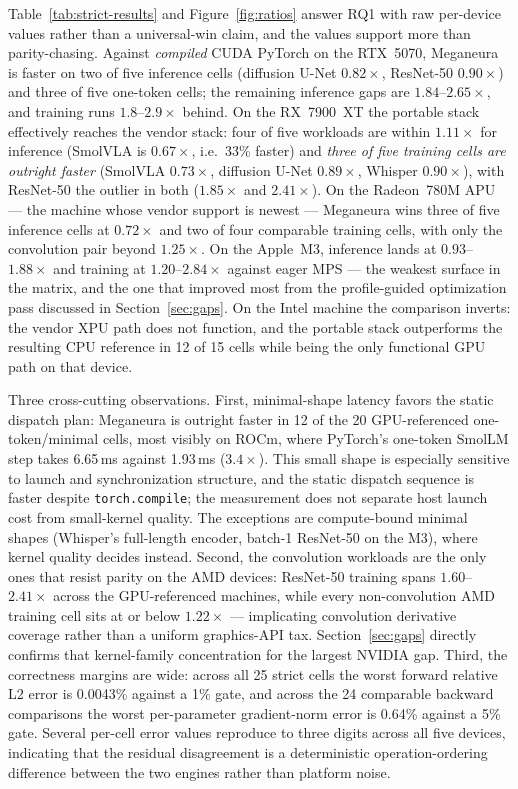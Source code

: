 \documentclass[10pt,twocolumn]{article}
\newcommand{\system}{Meganeura}
\newcommand{\code}[1]{\texttt{#1}}
\begin{document}
Table~\ref{tab:strict-results} and Figure~\ref{fig:ratios} answer RQ1 with
raw per-device values rather than a universal-win claim, and the values
support more than parity-chasing.
Against \emph{compiled} CUDA PyTorch on the RTX~5070, \system{} is faster on
two of five inference cells (diffusion U-Net $0.82\times$, ResNet-50
$0.90\times$) and three of five one-token cells; the remaining inference
gaps are $1.84$--$2.65\times$, and training runs $1.8$--$2.9\times$ behind.
On the RX~7900~XT the portable stack effectively reaches the vendor stack:
four of five workloads are within $1.11\times$ for inference (SmolVLA is
$0.67\times$, i.e.\ 33\% faster) and \emph{three of five training cells are
outright faster} (SmolVLA $0.73\times$, diffusion U-Net $0.89\times$,
Whisper $0.90\times$), with ResNet-50 the outlier in both ($1.85\times$ and
$2.41\times$). On the Radeon~780M APU --- the machine whose vendor support
is newest --- \system{} wins three of five inference cells at $0.72\times$
and two of four comparable training cells, with only the convolution pair beyond
$1.25\times$. On the Apple~M3, inference lands at $0.93$--$1.88\times$ and
training at $1.20$--$2.84\times$ against eager MPS --- the weakest surface
in the matrix, and the one that improved most from the profile-guided
optimization pass discussed in Section~\ref{sec:gaps}. On the Intel machine
the comparison inverts: the vendor XPU path does not function, and the
portable stack outperforms the resulting CPU reference in 12 of 15 cells
while being the only functional GPU path on that device.

Three cross-cutting observations. First, minimal-shape latency favors the
static dispatch plan: \system{} is outright faster in 12 of the 20
GPU-referenced one-token/minimal cells, most visibly on ROCm, where PyTorch's
one-token SmolLM step takes 6.65\,ms against 1.93\,ms ($3.4\times$). This
small shape is especially sensitive to launch and synchronization structure,
and the static dispatch sequence is faster despite \code{torch.compile}; the
measurement does not separate host launch cost from small-kernel quality. The
exceptions are
compute-bound minimal shapes (Whisper's full-length encoder, batch-1
ResNet-50 on the M3), where kernel quality decides instead. Second, the
convolution workloads are the only ones that resist parity on the AMD
devices: ResNet-50 training spans $1.60$--$2.41\times$ across the
GPU-referenced machines, while every non-convolution AMD training cell sits
at or below $1.22\times$ --- implicating convolution derivative coverage
rather than a uniform graphics-API tax. Section~\ref{sec:gaps} directly
confirms that kernel-family concentration for the largest NVIDIA gap.
Third, the correctness margins are wide: across all 25 strict cells the
worst forward relative L2 error is 0.0043\% against a 1\% gate, and across
the 24 comparable backward comparisons the worst per-parameter gradient-norm
error is 0.64\% against a 5\% gate. Several per-cell error values reproduce to three digits across
all five devices, indicating that the residual disagreement is a
deterministic operation-ordering difference between the two engines rather
than platform noise.
\end{document}
